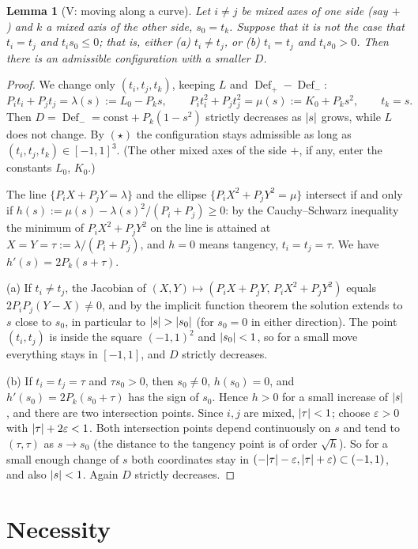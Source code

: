 \documentclass[11pt]{article}
\newtheorem{lemma}[theorem]{Lemma}
\theoremstyle{definition}
\theoremstyle{remark}
\newcommand{\Def}{\operatorname{Def}}
\DeclarePairedDelimiter{\abs}{\lvert}{\rvert}
\begin{document}
\begin{lemma}[V: moving along a curve]\label{lem:V}
Let $i\ne j$ be mixed axes of one side (say $+$) and $k$ a mixed axis of the other side, $s_0=t_k$.
Suppose that it is not the case that $t_i=t_j$ and $t_is_0\le0$; that is, either (a) $t_i\ne t_j$, or
(b) $t_i=t_j$ and $t_is_0>0$. Then there is an admissible configuration with a smaller $D$.
\end{lemma}
\begin{proof}
We change only $(t_i,t_j,t_k)$, keeping $L$ and $\Def_+-\Def_-$:
\[
P_it_i+P_jt_j=\lambda(s):=L_0-P_ks,\qquad P_it_i^2+P_jt_j^2=\mu(s):=K_0+P_ks^2,\qquad t_k=s .
\]
Then $D=\Def_-=\mathrm{const}+P_k(1-s^2)$ strictly decreases as $\abs s$ grows, while $L$ does not change.
By $(\star)$ the configuration stays admissible as long as $(t_i,t_j,t_k)\in[-1,1]^3$. (The other mixed axes
of the side $+$, if any, enter the constants $L_0$, $K_0$.)

The line $\{P_iX+P_jY=\lambda\}$ and the ellipse $\{P_iX^2+P_jY^2=\mu\}$ intersect if and only if
$h(s):=\mu(s)-\lambda(s)^2/(P_i+P_j)\ge0$: by the Cauchy--Schwarz inequality the minimum of
$P_iX^2+P_jY^2$ on the line is attained at $X=Y=\tau:=\lambda/(P_i+P_j)$, and $h=0$ means tangency,
$t_i=t_j=\tau$. We have $h'(s)=2P_k(s+\tau)$.

(a) If $t_i\ne t_j$, the Jacobian of $(X,Y)\mapsto(P_iX+P_jY,\,P_iX^2+P_jY^2)$ equals
$2P_iP_j(Y-X)\ne0$, and by the implicit function theorem the solution extends to $s$ close to $s_0$, in
particular to $\abs s>\abs{s_0}$ (for $s_0=0$ in either direction). The point $(t_i,t_j)$ is inside the
square $(-1,1)^2$ and $\abs{s_0}<1$, so for a small move everything stays in $[-1,1]$, and $D$ strictly decreases.

(b) If $t_i=t_j=\tau$ and $\tau s_0>0$, then $s_0\ne0$, $h(s_0)=0$, and $h'(s_0)=2P_k(s_0+\tau)$ has the sign
of $s_0$. Hence $h>0$ for a small increase of $\abs s$, and there are two intersection points. Since $i,j$ are
mixed, $\abs\tau<1$; choose $\varepsilon>0$ with $\abs\tau+2\varepsilon<1$. Both intersection points depend
continuously on $s$ and tend to $(\tau,\tau)$ as $s\to s_0$ (the distance to the tangency point is of order
$\sqrt h$). So for a small enough change of $s$ both coordinates stay in $(-\abs\tau-\varepsilon,\abs\tau+\varepsilon)\subset(-1,1)$,
and also $\abs s<1$. Again $D$ strictly decreases.
\end{proof}

\section{Necessity}\label{sec:nec}
\end{document}
